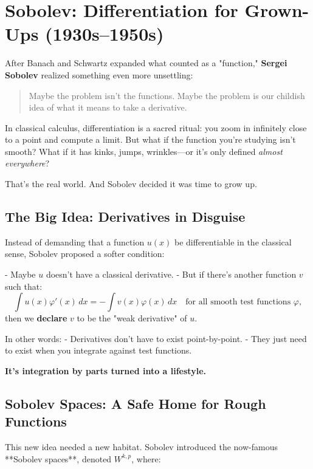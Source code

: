 \section{Sobolev: Differentiation for Grown-Ups (1930s–1950s)}

After Banach and Schwartz expanded what counted as a "function,"  
\textbf{Sergei Sobolev} realized something even more unsettling:

\begin{quote}
    Maybe the problem isn’t the functions.  
    Maybe the problem is our childish idea of what it means to take a derivative.
\end{quote}

In classical calculus, differentiation is a sacred ritual:  
you zoom in infinitely close to a point and compute a limit.  
But what if the function you’re studying isn’t smooth?  
What if it has kinks, jumps, wrinkles—or it’s only defined \textit{almost everywhere}?

That’s the real world.  
And Sobolev decided it was time to grow up.

\subsection*{The Big Idea: Derivatives in Disguise}

Instead of demanding that a function \( u(x) \) be differentiable in the classical sense, Sobolev proposed a softer condition:

- Maybe \( u \) doesn’t have a classical derivative.
- But if there’s another function \( v \) such that:
\[
\int u(x) \varphi'(x)\, dx = -\int v(x) \varphi(x)\, dx
\quad \text{for all smooth test functions } \varphi,
\]
then we \textbf{declare} \( v \) to be the "weak derivative" of \( u \).

\smallskip

In other words:
- Derivatives don’t have to exist point-by-point.
- They just need to exist when you integrate against test functions.

\textbf{It’s integration by parts turned into a lifestyle.}

\subsection*{Sobolev Spaces: A Safe Home for Rough Functions}

This new idea needed a new habitat.  
Sobolev introduced the now-famous **Sobolev spaces**, denoted \( W^{k,p} \), where:

